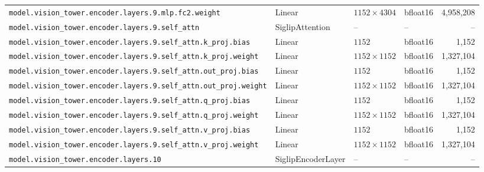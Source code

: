 \documentclass[10pt,a4paper]{article}
\theoremstyle{definition}
\begin{document}
\begin{appendices}
{\begin{longtable}{p{6.8cm}>{\raggedright\arraybackslash}p{3.3cm}llr}
\texttt{model.\allowbreak{}vision\_tower.\allowbreak{}encoder.\allowbreak{}layers.\allowbreak{}9.\allowbreak{}mlp.\allowbreak{}fc2.\allowbreak{}weight} & Linear & $1152 \times 4304$ & bfloat16 & 4,958,208 \\
\texttt{model.\allowbreak{}vision\_tower.\allowbreak{}encoder.\allowbreak{}layers.\allowbreak{}9.\allowbreak{}self\_attn} & Siglip\allowbreak{}Attention & -- & -- & -- \\
\texttt{model.\allowbreak{}vision\_tower.\allowbreak{}encoder.\allowbreak{}layers.\allowbreak{}9.\allowbreak{}self\_attn.\allowbreak{}k\_proj.\allowbreak{}bias} & Linear & $1152$ & bfloat16 & 1,152 \\
\texttt{model.\allowbreak{}vision\_tower.\allowbreak{}encoder.\allowbreak{}layers.\allowbreak{}9.\allowbreak{}self\_attn.\allowbreak{}k\_proj.\allowbreak{}weight} & Linear & $1152 \times 1152$ & bfloat16 & 1,327,104 \\
\texttt{model.\allowbreak{}vision\_tower.\allowbreak{}encoder.\allowbreak{}layers.\allowbreak{}9.\allowbreak{}self\_attn.\allowbreak{}out\_proj.\allowbreak{}bias} & Linear & $1152$ & bfloat16 & 1,152 \\
\texttt{model.\allowbreak{}vision\_tower.\allowbreak{}encoder.\allowbreak{}layers.\allowbreak{}9.\allowbreak{}self\_attn.\allowbreak{}out\_proj.\allowbreak{}weight} & Linear & $1152 \times 1152$ & bfloat16 & 1,327,104 \\
\texttt{model.\allowbreak{}vision\_tower.\allowbreak{}encoder.\allowbreak{}layers.\allowbreak{}9.\allowbreak{}self\_attn.\allowbreak{}q\_proj.\allowbreak{}bias} & Linear & $1152$ & bfloat16 & 1,152 \\
\texttt{model.\allowbreak{}vision\_tower.\allowbreak{}encoder.\allowbreak{}layers.\allowbreak{}9.\allowbreak{}self\_attn.\allowbreak{}q\_proj.\allowbreak{}weight} & Linear & $1152 \times 1152$ & bfloat16 & 1,327,104 \\
\texttt{model.\allowbreak{}vision\_tower.\allowbreak{}encoder.\allowbreak{}layers.\allowbreak{}9.\allowbreak{}self\_attn.\allowbreak{}v\_proj.\allowbreak{}bias} & Linear & $1152$ & bfloat16 & 1,152 \\
\texttt{model.\allowbreak{}vision\_tower.\allowbreak{}encoder.\allowbreak{}layers.\allowbreak{}9.\allowbreak{}self\_attn.\allowbreak{}v\_proj.\allowbreak{}weight} & Linear & $1152 \times 1152$ & bfloat16 & 1,327,104 \\
\texttt{model.\allowbreak{}vision\_tower.\allowbreak{}encoder.\allowbreak{}layers.\allowbreak{}10} & Siglip\allowbreak{}Encoder\allowbreak{}Layer & -- & -- & -- \\

\end{longtable}}
\end{appendices}
\end{document}
